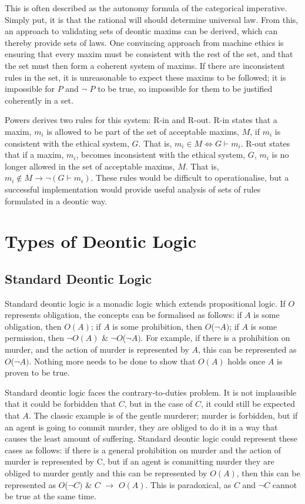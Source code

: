 \documentclass{l4proj}
\begin{document}
This is often described as the autonomy formula of the categorical imperative. Simply put, it is that the rational will should determine universal law. From this, an approach to validating sets of deontic maxims can be derived, which can thereby provide sets of laws. One convincing approach from machine ethics is ensuring that every maxim must be consistent with the rest of the set, and that the set must then form a coherent system of maxims\cite{Powers}. If there are inconsistent rules in the set, it is unreasonable to expect these maxims to be followed; it is impossible for $P$ and \( \neg \) $P$ to be true, so impossible for them to be justified coherently in a set. 

Powers derives two rules for this system: R-in and R-out. R-in states that a maxim, $m_i$ is allowed to be part of the set of acceptable maxims, $M$, if $m_i$ is consistent with the ethical system, $G$. That is, $m_i \in M \iff G \vdash m_i $. R-out states that if a maxim, $m_i$, becomes inconsistent with the ethical system, $G$, $m_i$ is no longer allowed in the set of acceptable maxims, $M$. That is, $m_i \notin M \rightarrow \neg(G \vdash m_i)$. These rules would be difficult to operationalise, but a successful implementation would provide useful analysis of sets of rules formulated in a deontic way. 


\section{Types of Deontic Logic}

\subsection{Standard Deontic Logic}
Standard deontic logic is a monadic logic which extends propositional logic. If $O$ represents obligation, the concepts can be formalised as follows: if $A$ is some obligation, then $O(A)$; if $A$ is some prohibition, then $O$(\( \neg \)$A)$; if $A$ is some permission, then \( \neg \)$O(A)$ \& \( \neg \)$O$(\( \neg \)$A)$. For example, if there is a prohibition on murder, and the action of murder is represented by $A$, this can be represented as $O$(\( \neg \)$A)$. Nothing more needs to be done to show that $O(A)$ holds once $A$ is proven to be true. 

Standard deontic logic faces the contrary-to-duties problem. It is not implausible that it could be forbidden that $C$, but in the case of $C$, it could still be expected that $A$. The classic example is of the gentle murderer; murder is forbidden, but if an agent is going to commit murder, they are obliged to do it in a way that causes the least amount of suffering. Standard deontic logic could represent these cases as follows: if there is a general prohibition on murder and the action of murder is represented by C, but if an agent is committing murder they are obliged to murder gently and this can be represented by $O(A)$, then this can be represented as $O$(\( \neg \)$C)$ \& $C$ \( \to \) $O(A)$. This is paradoxical, as $C$ and \( \neg \)$C$ cannot be true at the same time. 
\end{document}
